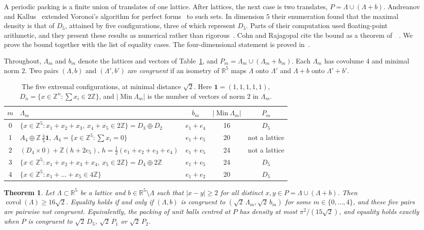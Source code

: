\documentclass[11pt]{amsart}
\newtheorem{theorem}{Theorem}[section]
\theoremstyle{definition}
\theoremstyle{remark}
\numberwithin{equation}{section}
\numberwithin{table}{section}
\numberwithin{figure}{section}
\newcommand{\R}{\mathbb{R}}
\newcommand{\Z}{\mathbb{Z}}
\newcommand{\Min}{\operatorname{Min}}
\newcommand{\covol}{\operatorname{covol}}
\newcommand{\one}{\mathbf{1}}
\begin{document}
A periodic packing is a finite union of translates of one lattice. After lattices, the next case is two translates, $P=\Lambda\cup(\Lambda+b)$. Andreanov and Kallus~\cite{AK2020} extended Voronoi's algorithm for perfect forms~\cite{Voronoi1908} to such sets. In dimension $5$ their enumeration found that the maximal density is that of $D_5$, attained by five configurations, three of which represent $D_5$. Parts of their computation used floating-point arithmetic, and they present these results as numerical rather than rigorous~\cite[\S4]{AK2020}. Cohn and Rajagopal cite the bound as a theorem of~\cite{AK2020}~\cite[\S4.2]{CR2026}. We prove the bound together with the list of equality cases. The four-dimensional statement is proved in~\cite{Bha2026a}.

Throughout, $\Lambda_m$ and $b_m$ denote the lattices and vectors of Table~\ref{tab:five}, and $P_m=\Lambda_m\cup(\Lambda_m+b_m)$. Each $\Lambda_m$ has covolume $4$ and minimal norm $2$. Two pairs $(\Lambda,b)$ and $(\Lambda',b')$ are \emph{congruent} if an isometry of $\R^5$ maps $\Lambda$ onto $\Lambda'$ and $\Lambda+b$ onto $\Lambda'+b'$.

\begin{table}[t]
\centering
\small
\renewcommand{\arraystretch}{1.2}
\begin{tabular}{@{}c l c c c@{}}
\toprule
$m$ & $\Lambda_m$ & $b_m$ & $|\Min\Lambda_m|$ & $P_m$\\
\midrule
0 & $\{x\in\Z^5:x_1+x_2+x_3,\ x_4+x_5\in2\Z\}=D_3\oplus D_2$ & $e_1+e_4$ & 16 & $D_5$\\
1 & $A_4\oplus\Z\,\tfrac45\one$, \quad $A_4=\{x\in\Z^5:\sum x_i=0\}$ & $e_1+e_5$ & 20 & not a lattice\\
2 & $(D_4\times0)+\Z(h+2e_5)$, \quad $h=\tfrac12(e_1+e_2+e_3+e_4)$ & $e_1+e_5$ & 24 & not a lattice\\
3 & $\{x\in\Z^5:x_1+x_2+x_3+x_4,\ x_5\in2\Z\}=D_4\oplus2\Z$ & $e_1+e_5$ & 24 & $D_5$\\
4 & $\{x\in\Z^5:x_1+\dots+x_5\in4\Z\}$ & $e_1+e_2$ & 20 & $D_5$\\
\bottomrule
\end{tabular}
\caption{The five extremal configurations, at minimal distance $\sqrt2$. Here $\one=(1,1,1,1,1)$, $D_n=\{x\in\Z^n:\sum x_i\in2\Z\}$, and $|\Min\Lambda_m|$ is the number of vectors of norm $2$ in $\Lambda_m$.}
\label{tab:five}
\end{table}

\begin{theorem}\label{thm:main}
Let $\Lambda\subset\R^5$ be a lattice and $b\in\R^5\setminus\Lambda$ such that $|x-y|\ge2$ for all distinct $x,y\in P=\Lambda\cup(\Lambda+b)$. Then $\covol(\Lambda)\ge16\sqrt2$. Equality holds if and only if $(\Lambda,b)$ is congruent to $(\sqrt2\,\Lambda_m,\sqrt2\,b_m)$ for some $m\in\{0,\dots,4\}$, and these five pairs are pairwise not congruent. Equivalently, the packing of unit balls centred at $P$ has density at most $\pi^2/(15\sqrt2)$, and equality holds exactly when $P$ is congruent to $\sqrt2\,D_5$, $\sqrt2\,P_1$ or $\sqrt2\,P_2$.
\end{theorem}
\end{document}

